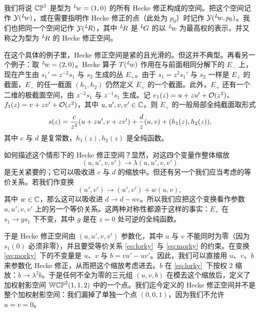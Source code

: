 我们将说 $\Bbb{CP}^1$ 是型为 $^L\negthinspace w=(1,0)$ 的所有 Hecke 修正构成的空间。把这个空间记作 ${{\EUY}}(^L\negthinspace w)$，或在需要指明作 Hecke 修正的点（此处为 $p_0$）时记作 ${{\EUY}}(^L\negthinspace w,p_0)$。我们也把同一个空间记作 ${{\EUY}}(^L\negthinspace R)$，其中 $^L\negthinspace R$ 是 $^L\negthinspace G$ 的以 $^L\negthinspace w$ 为最高权的表示，并又称之为型为 $^L\negthinspace R$ 的 Hecke 修正空间。

在这个具体的例子里，Hecke 修正空间是紧的且光滑的。但这并不典型。再看另一个例子：取 $^L\negthinspace w=(2,0)$。Hecke 算子 $T(^L\negthinspace w)$ 作用在与前面相同分解下的 $E_-$ 上，现在产生由 $s_1'=z^{-2}s_1$ 与 $s_2$ 生成的丛 $E_+$。由于 $s_1=z^2s_1'$ 与 $s_2$ 一样是 $E_+$ 的截面，$E_-$ 的任一截面 $(h_1,h_2)$ 仍然定义 $E_+$ 的一个截面。此外，$E_+$ 还有一个二维的极截面空间，由 $z^{-2}s_1$ 与 $z^{-1}s_1$ 生成。记 $e_1(z)=u+zu'+{\cal O}(z^2)$、$f_1(z)=v+zv'+{\cal O}(z^2)$，其中 $u,u',v,v'\in\Bbb{C}$。则 $E_+$ 的一般局部全纯截面取形式 %
\setcounter{equation}{16}
\begin{equation}\label{eq:ilko}
s(z)={c\over
z^2}(u+zu',v+zv')+{d\over z} (u,v)+(h_1(z),h_2(z)),
\end{equation}
其中 $c$ 与 $d$ 是复常数，$h_1(z),h_2(z)$ 是全纯函数。

如何描述这个情形下的 Hecke 修正空间？显然，对这四个变量作整体缩放
\setcounter{equation}{17}
\begin{equation}\label{eq:lorky}
(u,u',v,v')\to\lambda (u,u',v,v')
\end{equation}
是无关紧要的；它可以吸收进 $c$ 与 $d$ 的缩放中。但还有另一个我们应当考虑的等价关系。若我们作变换 %
\setcounter{equation}{18}
\begin{equation}\label{eq:morky}
(u',v')\to (u', v')+w(u,v),
\end{equation}
其中 $w\in\Bbb{C}$，那么这可以吸收进 $d\to d-wc$。所以我们应把这个变换看作参数 $u,u',v,v'$ 上的另一个等价关系。这两种对称性都源于这样的事实：$E_+$ 在 $s_1\to gs_1$ 下不变，其中 $g$ 是在 $z=0$ 处可逆的全纯函数。


于是 Hecke 修正空间由 $(u,u',v,v')$ 参数化，其中 $u$ 与 $v$ 不能同时为零（因为 $s_1(0)$ 必须非零），并且要受等价关系 \eqref{eq:lorky}\ 与 \eqref{eq:morky} 的约束。在变换 \eqref{eq:morky}\ 下的不变量是 $u$、$v$ 与 $b=vu'-uv'$。因此，我们可以直接用 $u$、$v$、$b$ 来参数化 Hecke 修正，从而把这个缩放考虑进去。$b$ 在 \eqref{eq:lorky}\ 下按权 2 缩放：$b\to \lambda^2b$。于是任何不全为零的三元组 $(u,v,b)$ 在模去这个缩放后，定义了加权射影空间 $\Bbb{WCP}^2(1,1,2)$ 中的一个点。我们迄今定义的 Hecke 修正空间并不是整个加权射影空间：我们漏掉了单独一个点 $(0,0,1)$，因为我们不允许 $u=v=0$。

